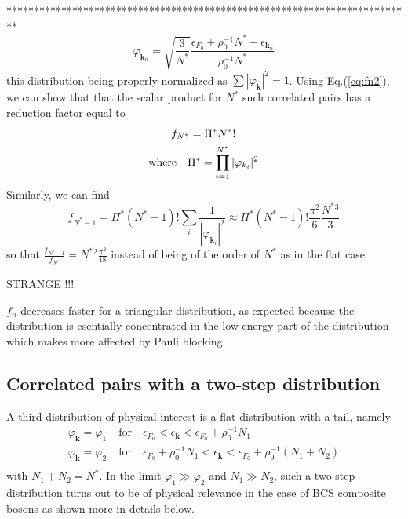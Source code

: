 \documentclass[aps,prb,preprint,groupedaddress,amsmath]{revtex4-1}
\newcommand{\vk}{\ensuremath{\mathbf{k}}}
\begin{document}
**************************************************************************
\begin{equation}
 \varphi_{\vk_n}=\sqrt{\frac{3}{N^*}}\frac{\epsilon_{F_0}+\rho_0^{-1}N^*-\epsilon_{\vk_n}}{\rho_0^{-1}N^*}
\end{equation}
this distribution being properly normalized as $\sum|\varphi_\vk|^2=1$.  Using Eq.(\ref{eq:fn2}), we can show that that the scalar product for $N^*$ such correlated pairs  has a reduction factor equal to
\begin{gather}
f_{N^*}=\Pi^*N^*!\\
\mbox{where}\quad \Pi^*=\prod_{i=1}^{N^*}|\varphi_{k_i} |^2\notag
\end{gather}
Similarly, we can find
\begin{equation}
 f_{N^*-1}=\Pi^*(N^*-1)!\sum_{i}\frac{1}{|\varphi_{\vk_i}|^2}\approx\Pi^*(N^*-1)!\frac{\pi^2}{6}\frac{N^*{}^3}{3}
\end{equation}
so that $\frac{f_{N^*-1}}{f_{N^*}}=N^*{}^2\frac{\pi^2}{18}$ instead of being of the order of $N^*$ as in the flat case: 

STRANGE !!!

 $f_n$ decreases faster for a triangular distribution, as expected because the distribution is esentially concentrated in the low energy part of the distribution which makes more affected by Pauli blocking.   





\subsection{Correlated pairs with a two-step distribution}
A third distribution of physical interest is a flat distribution with a tail, namely
\begin{equation}
 \begin{split}
  \varphi_\vk=\varphi_1&\; \mbox{for}\quad{}\epsilon_{F_0}<\epsilon_\vk<\epsilon_{F_0}+\rho_0^{-1}N_1\\
  \varphi_\vk=\varphi_2&\; \mbox{for}\quad{}\epsilon_{F_0}+\rho_0^{-1}N_1<\epsilon_\vk<\epsilon_{F_0}+\rho_0^{-1}(N_1+N_2)\\
 \end{split}
\end{equation}
with $N_1+N_2=N^*$. In the limit $\varphi_1\gg\varphi_2$ and $N_1\gg{}N_2$, such a two-step distribution turns out to be of physical relevance in the case of BCS composite bosons as shown more in details below. 
\end{document}
